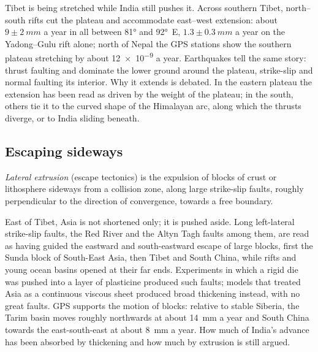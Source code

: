 Tibet is being stretched while India still pushes it. Across southern Tibet, north--south
rifts cut the plateau and accommodate east--west extension: about $9 \pm \qty{2}{mm}$ a year in
all between \ang{81} and \ang{92}~E, $1.3 \pm \qty{0.3}{mm}$ a year on the Yadong--Gulu rift
alone; north of Nepal the GPS stations show the southern plateau stretching by about
\num{12e-9} a year. Earthquakes tell the same story: thrust faulting and 
dominate the lower ground around the plateau, strike-slip and normal faulting its interior.
Why it extends is debated. In the eastern plateau the extension has been read as  driven by the weight of the plateau; in the south, others tie it to the curved shape
of the Himalayan arc, along which the thrusts diverge, or to India sliding beneath.

\subsection{Escaping sideways}

\begin{definition}\label{def:b2:himalaya-andes:extrusion}
\emph{Lateral extrusion} (escape tectonics) is the expulsion of
blocks of crust or lithosphere sideways from a collision zone, along large strike-slip faults,
roughly perpendicular to the direction of convergence, towards a free boundary.
\end{definition}

East of Tibet, Asia is not shortened only; it is pushed aside. Long left-lateral strike-slip
faults, the Red River and the Altyn Tagh faults among them, are read as having guided the
eastward and south-eastward escape of large blocks, first the Sunda block of South-East Asia,
then Tibet and South China, while rifts and young ocean basins opened at their far ends.
Experiments in which a rigid die was pushed into a layer of plasticine produced such faults;
models that treated Asia as a continuous viscous sheet produced broad thickening instead, with
no great faults. GPS supports the motion of blocks: relative to stable Siberia, the Tarim
basin moves roughly northwards at about \qty{14}{mm} a year and South China towards the east-south-east
at about \qty{8}{mm} a year. How much of India's advance has been absorbed by thickening and how
much by extrusion is still argued.

